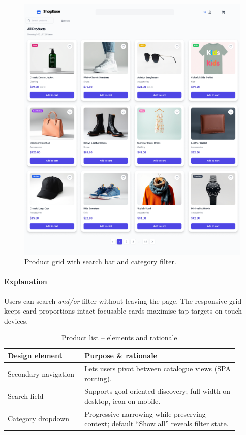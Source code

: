 \documentclass[11pt,a4paper]{article}
\begin{document}
\begin{figure}[H]
	\centering
	\includegraphics[width=\linewidth]{pictures/main/Product_List_Figma}%
	\caption{Product grid with search bar and category filter.}
	\label{fig:ui-products}
\end{figure}

\paragraph{Explanation}%
Users can search \emph{and/or} filter without leaving the page.  
The responsive grid keeps card proportions intact  focusable
cards maximise tap targets on touch devices.

\begin{table}[H]
	\centering
	\caption{Product list – elements and rationale}
	\label{tab:product-elements}
	\begin{tabular}{p{0.30\linewidth} p{0.60\linewidth}}
		\toprule
		\textbf{Design element} & \textbf{Purpose \& rationale} \\ \midrule
		Secondary navigation    & Lets users pivot between catalogue views (SPA routing).\\
		Search field            & Supports goal-oriented discovery; full-width on desktop, icon on mobile.\\
		Category dropdown       & Progressive narrowing while preserving context; default “Show all” reveals filter state.\\
	
	
		\bottomrule
	\end{tabular}
\end{table}
\end{document}

